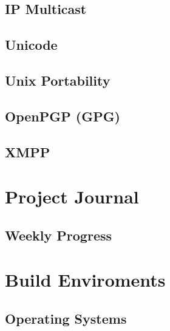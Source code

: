 \documentclass[a4paper,12pt]{report}
\begin{document}


\section{IP Multicast}

\todo

\section{Unicode}



\section{Unix Portability}



\section{OpenPGP (GPG)}



\section{XMPP}

\todo

\chapter{Project Journal}

\label{chap:journal}

\section{Weekly Progress}

\label{sec:progress}

\todo


\chapter{Build Enviroments}

\section{Operating Systems}


\end{document}
